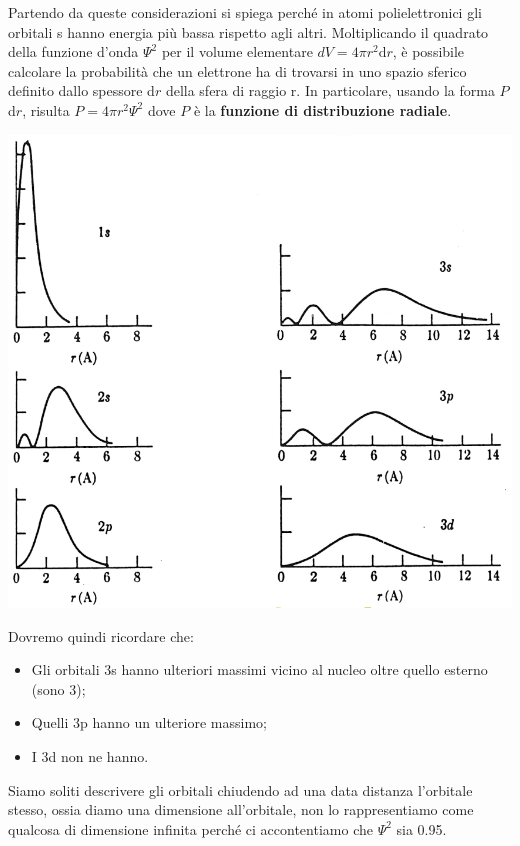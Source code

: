 Partendo da queste considerazioni si spiega perché in atomi polielettronici gli orbitali s hanno energia più bassa rispetto agli altri.
Moltiplicando il quadrato della funzione d'onda $\Psi^2$ per il volume elementare $dV=4\pi r^2\text{d}r$, è possibile calcolare la probabilità che un elettrone ha di trovarsi in uno spazio sferico definito dallo spessore d$r$ della sfera di raggio r. In particolare, usando la forma $P$d$r$, risulta $P=4\pi r^2\Psi^2$ dove $P$ è la \textbf{funzione di distribuzione radiale}.
\begin{center}
  \includegraphics[width=16cm]{immagini/picchi.png}
\end{center}
Dovremo quindi ricordare che:
\begin{itemize}
  \item Gli orbitali 3s hanno ulteriori massimi vicino al nucleo oltre quello esterno (sono 3);
  \item Quelli 3p hanno un ulteriore massimo;
  \item I 3d non ne hanno.
\end{itemize}
Siamo soliti descrivere gli orbitali chiudendo ad una data distanza l'orbitale stesso, ossia diamo una dimensione all'orbitale, non lo rappresentiamo come qualcosa di dimensione infinita perché ci accontentiamo che $\Psi^2$ sia 0.95.
